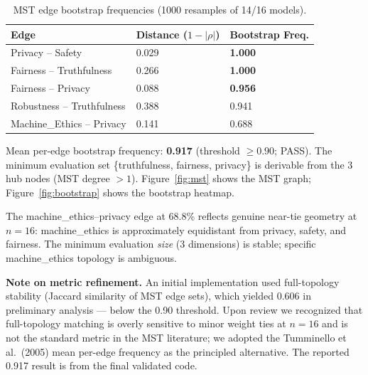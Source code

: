 \begin{table}[h]
\centering
\caption{MST edge bootstrap frequencies (1000 resamples of 14/16 models).}
\label{tab:mst}
\begin{tabular}{lll}
\toprule
\textbf{Edge} & \textbf{Distance ($1-|\rho|$)} & \textbf{Bootstrap Freq.} \\
\midrule
Privacy -- Safety & 0.029 & \textbf{1.000} \\
Fairness -- Truthfulness & 0.266 & \textbf{1.000} \\
Fairness -- Privacy & 0.088 & \textbf{0.956} \\
Robustness -- Truthfulness & 0.388 & 0.941 \\
Machine\_Ethics -- Privacy & 0.141 & 0.688 \\
\bottomrule
\end{tabular}
\end{table}

Mean per-edge bootstrap frequency: \textbf{0.917} (threshold $\geq 0.90$; PASS). The minimum evaluation set \{truthfulness, fairness, privacy\} is derivable from the 3 hub nodes (MST degree $> 1$). Figure~\ref{fig:mst} shows the MST graph; Figure~\ref{fig:bootstrap} shows the bootstrap heatmap.

The machine\_ethics--privacy edge at 68.8\% reflects genuine near-tie geometry at $n=16$: machine\_ethics is approximately equidistant from privacy, safety, and fairness. The minimum evaluation \emph{size} (3 dimensions) is stable; specific machine\_ethics topology is ambiguous.

\textbf{Note on metric refinement.} An initial implementation used full-topology stability (Jaccard similarity of MST edge sets), which yielded 0.606 in preliminary analysis --- below the 0.90 threshold. Upon review we recognized that full-topology matching is overly sensitive to minor weight ties at $n=16$ and is not the standard metric in the MST literature; we adopted the Tumminello et al.\ (2005) mean per-edge frequency as the principled alternative. The reported 0.917 result is from the final validated code.
